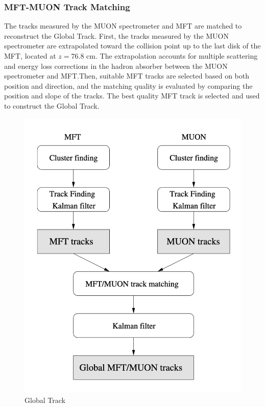        \subsubsection{MFT-MUON Track Matching}\label{MFT-MUON_matching}
            The tracks measured by the MUON spectrometer and MFT are matched to reconstruct the Global Track. First, the tracks measured by the MUON spectrometer are extrapolated toward the collision point up to the last disk of the MFT, located at $z=76.8$ cm. The extrapolation accounts for multiple scattering and energy loss corrections in the hadron absorber between the MUON spectrometer and MFT.\@ Then, suitable MFT tracks are selected based on both position and direction, and the matching quality is evaluated by comparing the position and slope of the tracks. The best quality MFT track is selected and used to construct the Global Track.
            \begin{figure}[htbp]
                \centering
                \includegraphics[keepaspectratio, scale=0.3]{fig/2_2_3_GlobalTrackReco.png}
                \caption{Global Track\cite{MFT_TDR}}
                \label{GlobalTrackReco}
            \end{figure}

